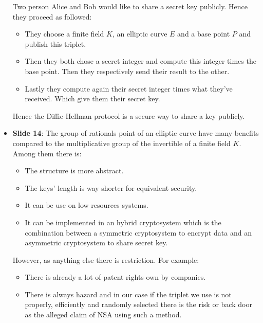 \begin{itemize}
            Two person Alice and Bob would like to share a secret key publicly. Hence they
            proceed as followed:
            \begin{itemize}
                \item They choose a finite field $K$, an elliptic curve $E$ and a base
                    point $P$ and publish this triplet.
                \item Then they both chose a secret integer and compute this integer times
                    the base point. Then they respectively send their result to the other.
                \item Lastly they compute again their secret integer times what they've
                    received. Which give them their secret key.
            \end{itemize}

            Hence the Diffie-Hellman protocol is a secure way to share a key publicly.

        \item \textbf{Slide 14}: The group of rationals point of an elliptic
            curve have many benefits compared to the multiplicative group of the
            invertible of a finite field $K$. Among them there is:
            \begin{itemize}
                \item The structure is more abstract.
                \item The keys' length is way shorter for equivalent security.
                \item It can be use on low resources systems.
                \item It can be implemented in an hybrid cryptosystem which is the
                    combination between a symmetric cryptosystem to encrypt data and
                    an asymmetric cryptosystem to share secret key.
            \end{itemize}

            However, as anything else there is restriction. For example:
            \begin{itemize}
                \item There is already a lot of patent rights own by companies.
                \item There is always hazard and in our case if the triplet we use is not
                    properly, efficiently and randomly selected there is the risk or
                    back door as the alleged claim of NSA using such a method.
            \end{itemize}
\end{itemize}

